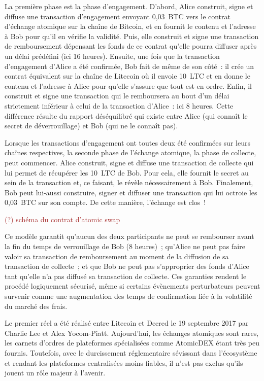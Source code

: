 La première phase est la phase d'engagement. D'abord, Alice construit, signe et diffuse une transaction d'engagement envoyant 0,03~BTC vers le contrat d'échange atomique sur la chaîne de Bitcoin, et en fournit le contenu et l'adresse à Bob pour qu'il en vérifie la validité. Puis, elle construit et signe une transaction de remboursement dépensant les fonds de ce contrat qu'elle pourra diffuser après un délai prédéfini (ici 16 heures). Ensuite, une fois que la transaction d'engagement d'Alice a été confirmée, Bob fait de même de son côté~: il crée un contrat équivalent sur la chaîne de Litecoin où il envoie 10~LTC et en donne le contenu et l'adresse à Alice pour qu'elle s'assure que tout est en ordre. Enfin, il construit et signe une transaction qui le remboursera au bout d'un délai strictement inférieur à celui de la transaction d'Alice~: ici 8 heures. Cette différence résulte du rapport déséquilibré qui existe entre Alice (qui connaît le secret de déverrouillage) et Bob (qui ne le connaît pas).

Lorsque les transactions d'engagement ont toutes deux été confirmées sur leurs chaînes respectives, la seconde phase de l'échange atomique, la phase de collecte, peut commencer. Alice construit, signe et diffuse une transaction de collecte qui lui permet de récupérer les 10~LTC de Bob. Pour cela, elle fournit le secret au sein de la transaction et, ce faisant, le révèle nécessairement à Bob. Finalement, Bob peut lui-aussi construire, signer et diffuser une transaction qui lui octroie les 0,03~BTC sur son compte. De cette manière, l'échange est clos~!

\textcolor{brown}{(?) schéma du contrat d'atomic swap}

Ce modèle garantit qu'aucun des deux participants ne peut se rembourser avant la fin du temps de verrouillage de Bob (8 heures)~; qu'Alice ne peut pas faire valoir sa transaction de remboursement au moment de la diffusion de sa transaction de collecte~; et que Bob ne peut pas s'approprier des fonds d'Alice tant qu'elle n'a pas diffusé sa transaction de collecte. Ces garanties rendent le procédé logiquement sécurisé, même si certains évènements perturbateurs peuvent survenir comme une augmentation des temps de confirmation liée à la volatilité du marché des frais.

Le premier  réel a été réalisé entre Litecoin et Decred le 19 septembre 2017 par Charlie Lee et Alex Yocom-Piatt. Aujourd'hui, les échanges atomiques sont rares, les carnets d'ordres de plateformes spécialisées comme AtomicDEX étant très peu fournis. Toutefois, avec le durcissement réglementaire sévissant dans l'écosystème et rendant les plateformes centralisées moins fiables, il n'est pas exclus qu'ils jouent un rôle majeur à l'avenir.

